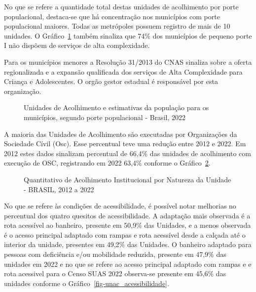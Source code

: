 \documentclass[
  letterpaper,
  DIV=11,
  numbers=noendperiod]{scrreprt}
\begin{document}
No que se refere a quantidade total destas unidades de acolhimento por
porte populacional, destaca-se que há concentração nos municípios com
porte populacional maiores. Todas as metrópoles possuem registro de mais
de 10 unidades. O Gráfico~\ref{fig-unac-porte} também sinaliza que 74\%
dos municípios de pequeno porte I não dispõem de serviços de alta
complexidade.

Para os municípios menores a Resolução 31/2013 do CNAS sinaliza sobre a
oferta regionalizada e a expansão qualificada dos serviços de Alta
Complexidade para Criança e Adolescentes. O orgão gestor estadual é
responsável por esta organização.

\begin{figure}


\caption{\label{fig-unac-porte}Unidades de Acolhimento e estimativas da
população para os municípios, segundo porte populacional - Brasil, 2022}

\end{figure}%

A maioria das Unidades de Acolhimento são executadas por Organizações da
Sociedade Cívil (Osc). Esse percentual teve uma redução entre 2012 e
2022. Em 2012 estes dados sinalizam percentual de 66,4\% das unidades de
acolhimento com execução de OSC, registrando em 2022 63,4\% conforme o
Gráfico~\ref{fig-acolh_nat}.

\begin{figure}


\caption{\label{fig-acolh_nat}Quantitativo de Acolhimento Institucional
por Natureza da Unidade - BRASIL, 2012 a 2022}

\end{figure}%

No que se refere às condições de acessibilidade, é possível notar
melhorias no percentual dos quatro quesitos de acessibilidade. A
adaptação mais observada é a rota acessível ao banheiro, presente em
50,9\% das Unidades, e a menos observada é o acesso principal adaptado
com rampas e rota acessível desde a calçada até o interior da unidade,
presentes em 49,2\% das Unidades. O banheiro adaptado para pessoas com
deficiência e/ou mobilidade reduzida, presente em 47,9\% das unidades em
2022 e no que se refere ao acesso principal adaptado com rampas e e rota
acessivel para o Censo SUAS 2022 observa-se presente em 45,6\% das
unidades conforme o Gráfico~\ref{fig-unac_acessibilidade}.
\end{document}
